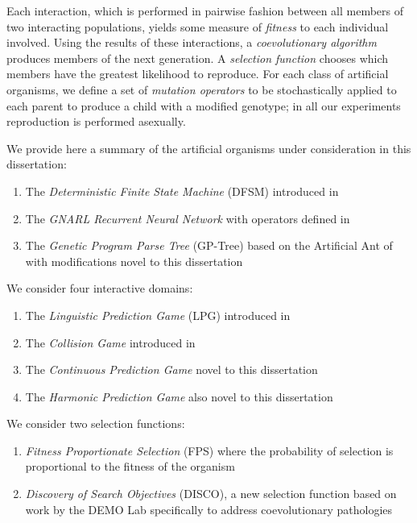 \documentclass{article}
\begin{document}
Each interaction, which is performed in pairwise fashion between all members of two interacting populations, 
yields some measure of \textit{fitness} to each individual involved. Using the results of these 
interactions, a \textit{coevolutionary algorithm} 
produces members of the next generation. A \textit{selection function} chooses which members
have the greatest likelihood to reproduce. For each class of artificial organisms, we define a set 
of \textit{mutation operators} to be stochastically applied to each parent to produce a child
with a modified genotype; in all our experiments reproduction is performed asexually.

We provide here a summary of the artificial organisms under consideration in this dissertation:
\begin{enumerate}
    \item The \textit{Deterministic Finite State Machine} (DFSM) introduced in \citet{moran2019evolving}
    \item The \textit{GNARL Recurrent Neural Network} with operators defined in \citet{willkens2022}
    \item The \textit{Genetic Program Parse Tree} (GP-Tree) based on the Artificial Ant of \citet{Koza92} with 
        modifications novel to this dissertation
\end{enumerate}

We consider four interactive domains:
\begin{enumerate}
    \item The \textit{Linguistic Prediction Game} (LPG) introduced in \citet{moran2019evolving}
    \item The \textit{Collision Game} introduced in \citet{willkens2022}
    \item The \textit{Continuous Prediction Game} novel to this dissertation
    \item The \textit{Harmonic Prediction Game} also novel to this dissertation
\end{enumerate}

We consider two selection functions:
\begin{enumerate}
    \item \textit{Fitness Proportionate Selection} (FPS) where the probability of selection 
        is proportional to the fitness of the organism
    \item \textit{Discovery of Search Objectives} (DISCO), a new selection function based on 
        work by the DEMO Lab specifically to address coevolutionary pathologies \citep{liskowski2016online}
\end{enumerate}
\end{document}
